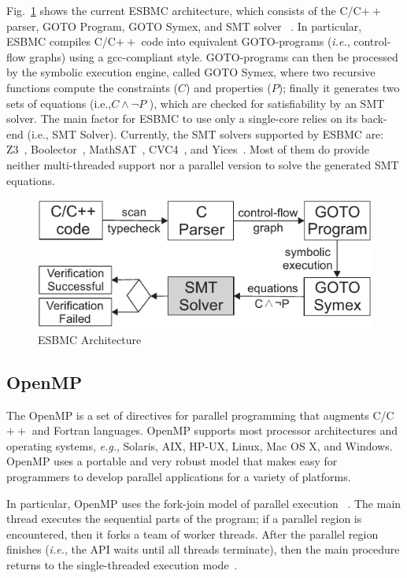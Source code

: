 Fig.~\ref{ESBMC-Architecture} shows the current ESBMC architecture, which consists of the C/C$++$ parser, GOTO Program, GOTO Symex, and SMT solver ~\cite{Ramalho2013}. In particular, ESBMC compiles C/C$++$ code into equivalent GOTO\hyp{}programs ({\it i.e.}, control-flow graphs) using a gcc-compliant style. GOTO-programs can then be processed by the symbolic execution engine, called GOTO Symex, where two recursive functions compute the constraints ($C$) and properties ($P$); finally it generates two sets of equations (i.e.,\:$C \land \neg P$ ), which are checked for satisfiability by an SMT solver. The main factor for ESBMC to use only a single-core relies on its back-end (i.e., SMT Solver). Currently, the SMT solvers supported by ESBMC are: Z3~\cite{DeMoura2008}, Boolector~\cite{Brummayer2009}, MathSAT~\cite{Barrett2011}, CVC4~\cite{Bozzano2005}, and Yices~\cite{Dutertre2014}. Most of them do provide neither multi-threaded support nor a parallel version to solve the generated SMT equations.
%
\begin{figure}[ht]
	\centering
  \includegraphics[scale=0.9]{Image/esbmc-arch-new.pdf} 
	\caption{ESBMC Architecture}
	\label{ESBMC-Architecture}
\end{figure}

\subsection{OpenMP}
\label{OpenMP}

The OpenMP is a set of directives for parallel programming that augments C/C$++$ and Fortran languages. OpenMP supports most processor architectures and operating systems, {\it e.g.}, Solaris, AIX, HP-UX, Linux, Mac OS X, and Windows. OpenMP uses a portable and very robust model that makes easy for programmers to develop parallel applications for a variety of platforms. 

In particular, OpenMP uses the fork-join model of parallel execution ~\cite{OpenMP1998}. The main thread executes the sequential parts of the program; if a parallel region is encountered, then it forks a team of worker threads. After the parallel region finishes ({\it i.e.}, the API waits until all threads terminate), then the main procedure returns to the single-threaded execution mode~\cite{Wu2014}.

